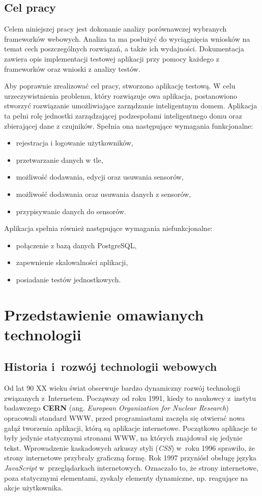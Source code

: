 \documentclass[mgr,oneside]{mgr}
\begin{document}
\section{Cel pracy}
Celem niniejszej pracy jest dokonanie analizy porównawczej wybranych frameworków webowych. Analiza ta ma posłużyć do wyciągnięcia wniosków na temat cech poszczególnych rozwiązań, a także ich wydajności. Dokumentacja zawiera opis implementacji testowej aplikacji przy pomocy każdego z frameworków oraz wnioski z analizy testów.

Aby poprawnie zrealizować cel pracy, stworzono aplikację testową. W celu urzeczywistnienia problemu, który rozwiązuje owa aplikacja, postanowiono stworzyć rozwiązanie umożliwiające zarządzanie inteligentnym domem. Aplikacja ta pełni rolę jednostki zarządzającej podzespołami inteligentnego domu oraz zbierającej dane z czujników. Spełnia ona następujące wymagania funkcjonalne:
\begin{itemize}
  \item rejestracja i logowanie użytkowników,
  \item przetwarzanie danych w tle,
  \item możliwość dodawania, edycji oraz usuwania sensorów,
  \item możliwość dodawania oraz usuwania danych z sensorów,
  \item przypisywanie danych do sensorów.
\end{itemize}

Aplikacja spełnia również następujące wymagania niefunkcjonalne:
\begin{itemize}
  \item połączenie z bazą danych PostgreSQL,
  \item zapewnienie skalowalności aplikacji,
  \item posiadanie testów jednostkowych.
\end{itemize}

\chapter{Przedstawienie omawianych technologii}
\section{Historia i~rozwój technologii webowych}
Od lat 90 XX wieku świat obserwuje bardzo dynamiczny rozwój technologii związanych z~Internetem. Począwszy od roku 1991, kiedy to naukowcy z~instytu badawczego \textbf{CERN} (ang. \textit{European Organization for Nuclear Research}) opracowali standard WWW, przed programiastami zaczęła się otwierać nowa gałąź tworzenia aplikacji, którą są aplikacje internetowe. Początkowo aplikacje te były jedynie statycznymi stronami WWW, na których znajdował się jedynie tekst. Wprowadzenie kaskadowych arkuszy styli (\emph{CSS}) w~roku 1996 sprawiło, że strony internetowe przybrały graficzną formę. Rok 1997 przyniósł obsługę języka \emph{JavaScript} w~przeglądarkach internetowych. Oznaczało to, że strony internetowe, poza statycznymi elementami, zyskały elementy dynamiczne, np. reagujące na akcje użytkownika.
\end{document}

